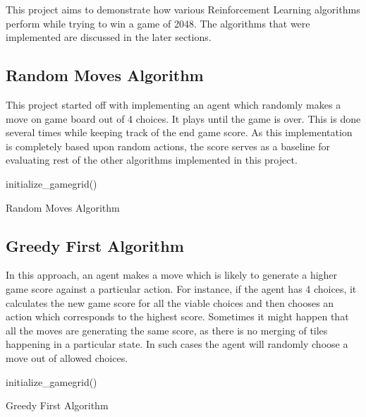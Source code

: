 \documentclass{svproc}
\begin{document}
    This project aims to demonstrate how various Reinforcement Learning algorithms perform while trying to win a game of 2048. The algorithms that were implemented are discussed in the later sections.

    \subsection{Random Moves Algorithm}

    This project started off with implementing an agent which randomly makes a move on game board out of 4 choices. It plays until the game is over. This is done several times while keeping track of the end game score. As this implementation is completely based upon random actions, the score serves as a baseline for evaluating rest of the other algorithms implemented in this project.


    \begin{algorithm}[h!]
        \SetAlgoLined
        initialize\_gamegrid()\;
        \caption{Random Moves Algorithm}
    \end{algorithm}

    \subsection{Greedy First Algorithm}
    In this approach, an agent makes a move which is likely to generate a higher game score against a particular action. For instance, if the agent has 4 choices, it calculates the new game score for all the viable choices and then chooses an action which corresponds to the highest score. Sometimes it might happen that all the moves are generating the same score, as there is no merging of tiles happening in a particular state. In such cases the agent will randomly choose a move out of allowed choices.

    \begin{algorithm}[h!]
        \SetAlgoLined
        initialize\_gamegrid()\;
        \caption{Greedy First Algorithm}
    \end{algorithm}
\end{document}
